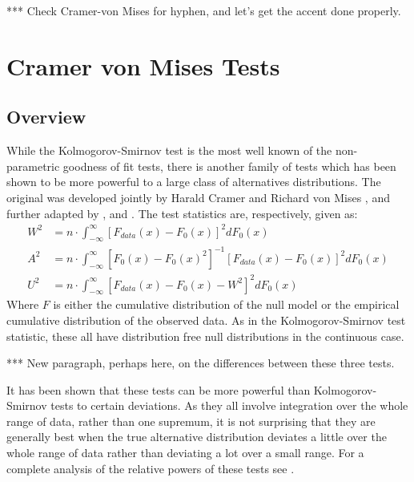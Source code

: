 \documentclass[article]{jss}
\begin{document}

*** Check Cramer-von Mises for hyphen, and let's get the accent done properly.

\section{Cramer von Mises Tests}

\subsection{Overview}

While the Kolmogorov-Smirnov test is the most well known of the non-parametric goodness of fit tests, there is another family of 
tests which has been shown to be more powerful to a large class of alternatives distributions. The original was developed jointly by
Harald Cramer and Richard von Mises \citep{cramer1928, vonmises1928}, and further adapted by \cite{anderson1952}, and 
\cite{Watson1961}. The test statistics are, respectively, given as:
\begin{align*}
W^2 &= n \cdot \int_{-\infty}^{\infty} \left[ F_{data}(x)- F_{0}(x) \right]^2 dF_0(x) \\
A^2 &= n \cdot \int_{-\infty}^{\infty} \left[F_0(x) -F_0(x)^2 \right]^{-1} \left[ F_{data}(x)- F_{0}(x) \right]^2 dF_0(x) \\
U^2 &= n \cdot \int_{-\infty}^{\infty} \left[ F_{data}(x)- F_{0}(x) - W^2 \right]^2 dF_0(x)
\end{align*}
Where $F$ is either the cumulative distribution of the null model or the empirical cumulative distribution of the observed data.
As in the Kolmogorov-Smirnov test statistic, these all have distribution free null distributions in the continuous case. 

*** New paragraph, perhaps here, on the differences between these three tests.

It has been shown that these tests can be more powerful than Kolmogorov-Smirnov tests to certain deviations. As they all involve
integration over the whole range of data, rather than one supremum, it is not surprising that they are generally best when the
true alternative distribution deviates a little over the whole range of data rather than deviating a lot over a small range. For
a complete analysis of the relative powers of these tests see \cite{stephens1974}.
\end{document}
